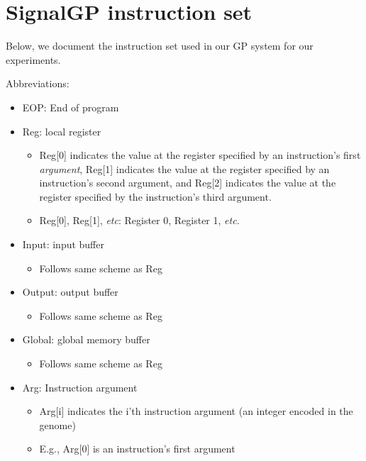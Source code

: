 \documentclass[
]{book}
\providecommand{\tightlist}{%
  \setlength{\itemsep}{0pt}\setlength{\parskip}{0pt}}
\begin{document}
\hypertarget{signalgp-instruction-set}{%
\chapter{SignalGP instruction set}\label{signalgp-instruction-set}}

Below, we document the instruction set used in our GP system for our experiments.

Abbreviations:

\begin{itemize}
\tightlist
\item
  EOP: End of program
\item
  Reg: local register

  \begin{itemize}
  \tightlist
  \item
    Reg{[}0{]} indicates the value at the register specified by an instruction's first \emph{argument}, Reg{[}1{]} indicates the value at the register specified by an instruction's second argument, and Reg{[}2{]} indicates the value at the register specified by the instruction's third argument.
  \item
    Reg{[}0{]}, Reg{[}1{]}, \emph{etc}: Register 0, Register 1, \emph{etc.}
  \end{itemize}
\item
  Input: input buffer

  \begin{itemize}
  \tightlist
  \item
    Follows same scheme as Reg
  \end{itemize}
\item
  Output: output buffer

  \begin{itemize}
  \tightlist
  \item
    Follows same scheme as Reg
  \end{itemize}
\item
  Global: global memory buffer

  \begin{itemize}
  \tightlist
  \item
    Follows same scheme as Reg
  \end{itemize}
\item
  Arg: Instruction argument

  \begin{itemize}
  \tightlist
  \item
    Arg{[}i{]} indicates the i'th instruction argument (an integer encoded in the genome)
  \item
    E.g., Arg{[}0{]} is an instruction's first argument
  \end{itemize}
\end{itemize}
\end{document}
